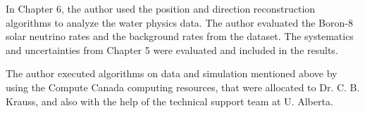 In Chapter 6, the author used the position and direction reconstruction algorithms to analyze the water physics data. The author evaluated the Boron-8 solar neutrino rates and the background rates from the dataset. The systematics and uncertainties from Chapter 5 were evaluated and included in the results.

The author executed algorithms on data and simulation mentioned above by using the Compute Canada computing resources, that were allocated to Dr. C. B. Krauss, and also with the help of the technical support team at U. Alberta.